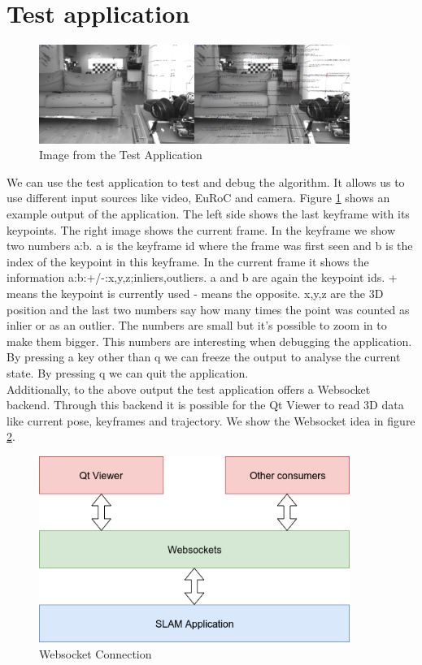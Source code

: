 \documentclass[11pt,a4paper,titlepage,oneside]{report}
\begin{document}
\section{Test application}

\begin{figure}[H]
  \centering
  \includegraphics[width=0.9\textwidth]{img/test_app.png}
  \caption{Image from the Test Application}\label{fig:test_app}
\end{figure}

We can use the test application to test and debug the algorithm. It allows us to use different input sources like video, EuRoC and camera. Figure \ref{fig:test_app} shows an example output of the application. The left side shows the last keyframe with its keypoints. The right image shows the current frame. In the keyframe we show two numbers a:b. a is the keyframe id where the frame was first seen and b is the index of the keypoint in this keyframe. In the current frame it shows the information a:b:+/-:x,y,z;inliers,outliers. a and b are again the keypoint ids. + means the keypoint is currently used - means the opposite. x,y,z are the 3D position and the last two numbers say how many times the point was counted as inlier or as an outlier. The numbers are small but it's possible to zoom in to make them bigger. This numbers are interesting when debugging the application. By pressing a key other than q we can freeze the output to analyse the current state. By pressing q we can quit the application.\\
Additionally, to the above output the test application offers a Websocket \cite{websocket} backend. Through this backend it is possible for the Qt Viewer to read 3D data like current pose, keyframes and trajectory. We show the Websocket idea in figure \ref{fig:websocket}.

\begin{figure}[H]
  \centering
  \includegraphics[width=0.9\textwidth]{img/websocket.png}
  \caption{Websocket Connection}\label{fig:websocket}
\end{figure}
\end{document}

